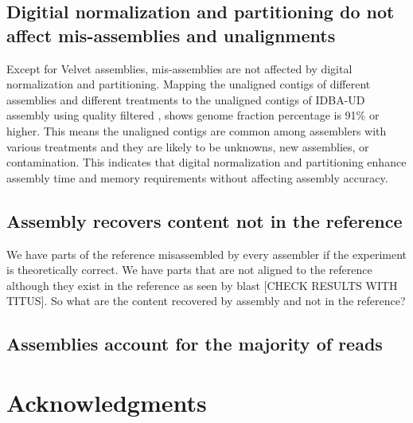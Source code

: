  \subsection*{Digitial normalization and partitioning do not  affect mis-assemblies and unalignments}
 
Except for Velvet assemblies, mis-assemblies are not affected by digital normalization and partitioning. 
Mapping the unaligned  contigs of different assemblies and different treatments to the unaligned contigs of  IDBA-UD  assembly using quality filtered , shows genome fraction percentage is 91\% or higher. This means the unaligned contigs are common among assemblers with various treatments and they are likely to be unknowns, new assemblies, or contamination. This indicates that digital normalization and partitioning enhance assembly time and memory requirements without affecting assembly accuracy.  

\subsection*{Assembly recovers content not in the reference } 
We have parts of the reference misassembled by every assembler if the experiment is theoretically correct. 
We have parts that are not aligned to the reference although they exist in the reference as seen by blast [CHECK RESULTS WITH TITUS]. 
So what are the content recovered by assembly and not in the reference?

\subsection*{Assemblies account for the majority of reads}
  

\section*{Acknowledgments}



%
%
% 


